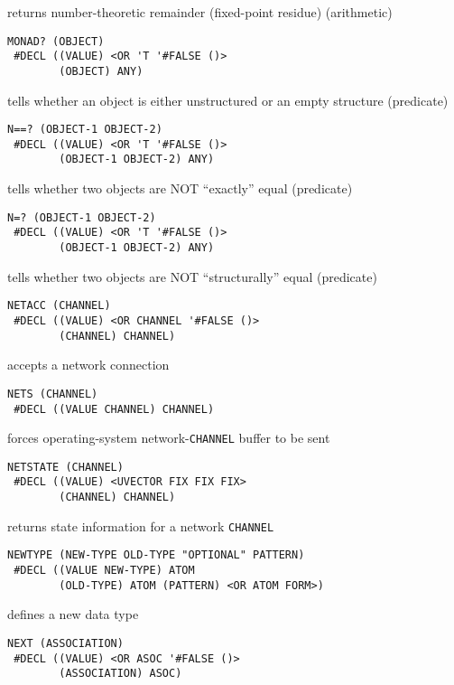 \documentclass[a4paper]{scrbook}
\begin{document}
returns number-theoretic remainder (fixed-point residue) (arithmetic)

\begin{verbatim}
MONAD? (OBJECT)
 #DECL ((VALUE) <OR 'T '#FALSE ()>
        (OBJECT) ANY)
\end{verbatim}

tells whether an object is either unstructured or an empty structure (predicate)

\begin{verbatim}
N==? (OBJECT-1 OBJECT-2)
 #DECL ((VALUE) <OR 'T '#FALSE ()>
        (OBJECT-1 OBJECT-2) ANY)
\end{verbatim}

tells whether two objects are NOT ``exactly'' equal (predicate)

\begin{verbatim}
N=? (OBJECT-1 OBJECT-2)
 #DECL ((VALUE) <OR 'T '#FALSE ()>
        (OBJECT-1 OBJECT-2) ANY)
\end{verbatim}

tells whether two objects are NOT ``structurally'' equal (predicate)

\begin{verbatim}
NETACC (CHANNEL)
 #DECL ((VALUE) <OR CHANNEL '#FALSE ()>
        (CHANNEL) CHANNEL)
\end{verbatim}

accepts a network connection

\begin{verbatim}
NETS (CHANNEL)
 #DECL ((VALUE CHANNEL) CHANNEL)
\end{verbatim}

forces operating-system network-\texttt{CHANNEL} buffer to be sent

\begin{verbatim}
NETSTATE (CHANNEL)
 #DECL ((VALUE) <UVECTOR FIX FIX FIX>
        (CHANNEL) CHANNEL)
\end{verbatim}

returns state information for a network \texttt{CHANNEL}

\begin{verbatim}
NEWTYPE (NEW-TYPE OLD-TYPE "OPTIONAL" PATTERN)
 #DECL ((VALUE NEW-TYPE) ATOM
        (OLD-TYPE) ATOM (PATTERN) <OR ATOM FORM>)
\end{verbatim}

defines a new data type

\begin{verbatim}
NEXT (ASSOCIATION)
 #DECL ((VALUE) <OR ASOC '#FALSE ()>
        (ASSOCIATION) ASOC)
\end{verbatim}
\end{document}
